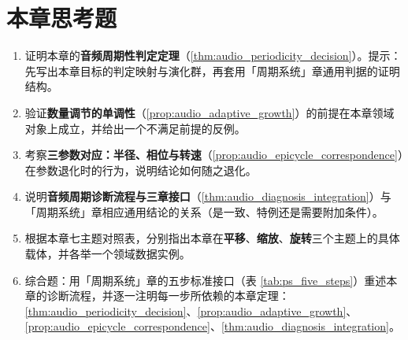 \section*{本章思考题}

\begin{enumerate}[leftmargin=3em, label=\textbf{题 \arabic*}]
    \item 证明本章的\textbf{音频周期性判定定理}（\ref{thm:audio_periodicity_decision}）。提示：先写出本章目标的判定映射与演化群，再套用「周期系统」章通用判据的证明结构。

    \item 验证\textbf{数量调节的单调性}（\ref{prop:audio_adaptive_growth}）的前提在本章领域对象上成立，并给出一个不满足前提的反例。

    \item 考察\textbf{三参数对应：半径、相位与转速}（\ref{prop:audio_epicycle_correspondence}）在参数退化时的行为，说明结论如何随之退化。

    \item 说明\textbf{音频周期诊断流程与三章接口}（\ref{thm:audio_diagnosis_integration}）与「周期系统」章相应通用结论的关系（是一致、特例还是需要附加条件）。

    \item 根据本章七主题对照表，分别指出本章在\textbf{平移}、\textbf{缩放}、\textbf{旋转}三个主题上的具体载体，并各举一个领域数据实例。

    \item 综合题：用「周期系统」章的五步标准接口（表 \ref{tab:ps_five_steps}）重述本章的诊断流程，并逐一注明每一步所依赖的本章定理：\ref{thm:audio_periodicity_decision}、\ref{prop:audio_adaptive_growth}、\ref{prop:audio_epicycle_correspondence}、\ref{thm:audio_diagnosis_integration}。
\end{enumerate}


